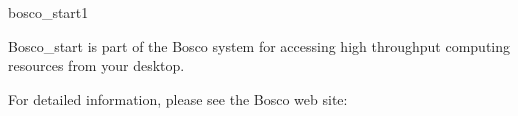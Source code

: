 \begin{ManPage}{\label{man-bosco-start}bosco\_start}{1}
{Bosco\_start is part of the Bosco system for accessing high
throughput computing resources from your desktop.

For detailed information, please see the Bosco web site:
}


\end{ManPage}
